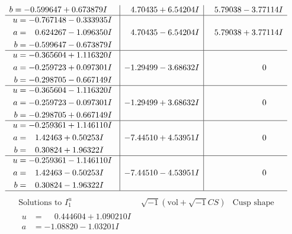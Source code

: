 \documentclass[1p]{elsarticle_modified}
\theoremstyle{definition}
\newcommand{\I}{\sqrt{-1}}
\begin{document}
$$\begin{array}{c|c|c}
\begin{aligned}
b &= -0.599647 + 0.673879 I\end{aligned}
 & \phantom{-}4.70435 + 6.54204 I & \phantom{-}5.79038 - 3.77114 I \\ \hline\begin{aligned}
u &= -0.767148 - 0.333935 I \\
a &= \phantom{-}0.624267 - 1.096350 I \\
b &= -0.599647 - 0.673879 I\end{aligned}
 & \phantom{-}4.70435 - 6.54204 I & \phantom{-}5.79038 + 3.77114 I \\ \hline\begin{aligned}
u &= -0.365604 + 1.116320 I \\
a &= -0.259723 + 0.097301 I \\
b &= -0.298705 - 0.667149 I\end{aligned}
 & -1.29499 - 3.68632 I & \phantom{-0.000000 } 0 \\ \hline\begin{aligned}
u &= -0.365604 - 1.116320 I \\
a &= -0.259723 - 0.097301 I \\
b &= -0.298705 + 0.667149 I\end{aligned}
 & -1.29499 + 3.68632 I & \phantom{-0.000000 } 0 \\ \hline\begin{aligned}
u &= -0.259361 + 1.146110 I \\
a &= \phantom{-}1.42463 + 0.50253 I \\
b &= \phantom{-}0.30824 + 1.96322 I\end{aligned}
 & -7.44510 + 4.53951 I & \phantom{-0.000000 } 0 \\ \hline\begin{aligned}
u &= -0.259361 - 1.146110 I \\
a &= \phantom{-}1.42463 - 0.50253 I \\
b &= \phantom{-}0.30824 - 1.96322 I\end{aligned}
 & -7.44510 - 4.53951 I & \phantom{-0.000000 } 0\\
 \hline 
 \end{array}$$\newpage$$\begin{array}{c|c|c}  
\text{Solutions to }I^u_{1}& \I (\text{vol} + \sqrt{-1}CS) & \text{Cusp shape}\\
 \hline 
\begin{aligned}
u &= \phantom{-}0.444604 + 1.090210 I \\
a &= -1.08820 - 1.03201 I \\

\end{aligned}
\end{array}$$
\end{document}
